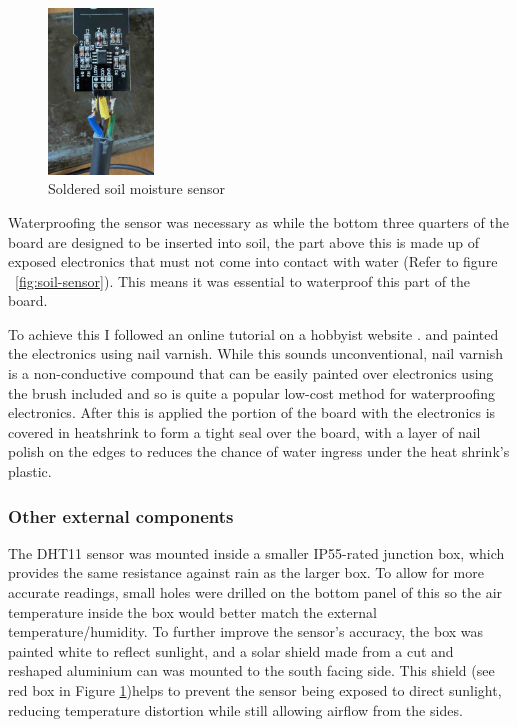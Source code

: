 \begin{figure}[H]
    \centering
    \includegraphics[width=0.25\textwidth]{contents/part-2/fig2/solder-soil.jpeg}
    \caption{Soldered soil moisture sensor}
    \label{fig:solder-soil}
\end{figure}

Waterproofing the sensor was necessary as while the bottom three quarters of the
board are designed to be inserted into soil, the part above this is made up of
exposed electronics that must not come into contact with water (Refer to figure
~\ref{fig:soil-sensor}). This means it was essential to waterproof this part of
the board.

To achieve this I followed an online tutorial on a hobbyist website
\cite{waterproof-sensor}. and painted the electronics using nail varnish. While
this sounds unconventional, nail varnish is a non-conductive compound that can
be easily painted over electronics using the brush included and so is quite a
popular low-cost method for waterproofing electronics. After this is applied the
portion of the board with the electronics is covered in heatshrink to form a
tight seal over the board, with a layer of nail polish on the edges to reduces
the chance of water ingress under the heat shrink's plastic.

\subsubsection{Other external components}

The DHT11 sensor was mounted inside a smaller IP55-rated junction box, which
provides the same resistance against rain as the larger box. To allow for more
accurate readings, small holes were drilled on the bottom panel of this so the
air temperature inside the box would better match the external
temperature/humidity. To further improve the sensor's accuracy, the box was
painted white to reflect sunlight, and a solar shield made from a cut and
reshaped aluminium can was mounted to the south facing side. This shield (see
red box in Figure \ref{fig:solder-soil})helps to prevent the sensor being
exposed to direct sunlight, reducing temperature distortion while still allowing
airflow from the sides.

